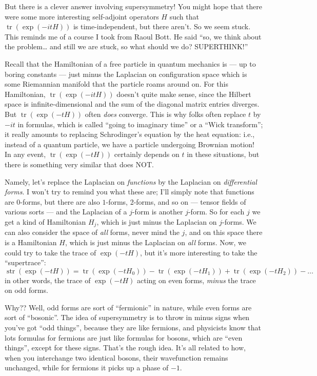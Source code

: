 \documentclass{article}
\begin{document}
But there is a clever answer involving supersymmetry! You might hope
that there were some more interesting self-adjoint operators \(H\) such
that \(\operatorname{tr}(\exp(-itH))\) is time-independent, but there
aren't. So we seem stuck. This reminds me of a course I took from Raoul
Bott. He said ``so, we think about the problem\ldots{} and still we are
stuck, so what should we do? SUPERTHINK!''

Recall that the Hamiltonian of a free particle in quantum mechanics is
--- up to boring constants --- just minus the Laplacian on configuration
space which is some Riemannian manifold that the particle roams around
on. For this Hamiltonian, \(\operatorname{tr}(\exp(-itH))\) doesn't
quite make sense, since the Hilbert space is infinite-dimensional and
the sum of the diagonal matrix entries diverges. But
\(\operatorname{tr}(\exp(-tH))\) often \emph{does} converge. This is why
folks often replace \(t\) by \(-it\) in formulas, which is called
``going to imaginary time'' or a ``Wick transform''; it really amounts
to replacing Schrodinger's equation by the heat equation: i.e., instead
of a quantum particle, we have a particle undergoing Brownian motion! In
any event, \(\operatorname{tr}(\exp(-tH))\) certainly depends on \(t\)
in these situations, but there is something very similar that does NOT.

Namely, let's replace the Laplacian on \emph{functions} by the Laplacian
on \emph{differential forms}. I won't try to remind you what these are;
I'll simply note that functions are 0-forms, but there are also
\(1\)-forms, 2-forms, and so on --- tensor fields of various sorts ---
and the Laplacian of a \(j\)-form is another \(j\)-form. So for each
\(j\) we get a kind of Hamiltonian \(H_j\), which is just minus the
Laplacian on \(j\)-forms. We can also consider the space of \emph{all}
forms, never mind the \(j\), and on this space there is a Hamiltonian
\(H\), which is just minus the Laplacian on \emph{all} forms. Now, we
could try to take the trace of \(\exp(-tH)\), but it's more interesting
to take the ``supertrace'':
\[\operatorname{str}(\exp(-tH)) = \operatorname{tr}(\exp(-tH_0)) - \operatorname{tr}(\exp(-tH_1)) + \operatorname{tr}(\exp(-tH_2)) - \ldots\]
in other words, the trace of \(\exp(-tH)\) acting on even forms,
\emph{minus} the trace on odd forms.

Why?? Well, odd forms are sort of ``fermionic'' in nature, while even
forms are sort of ``bosonic''. The idea of supersymmetry is to throw in
minus signs when you've got ``odd things'', because they are like
fermions, and physicists know that lots formulas for fermions are just
like formulas for bosons, which are ``even things'', except for these
signs. That's the rough idea. It's all related to how, when you
interchange two identical bosons, their wavefunction remains unchanged,
while for fermions it picks up a phase of \(-1\).
\end{document}
